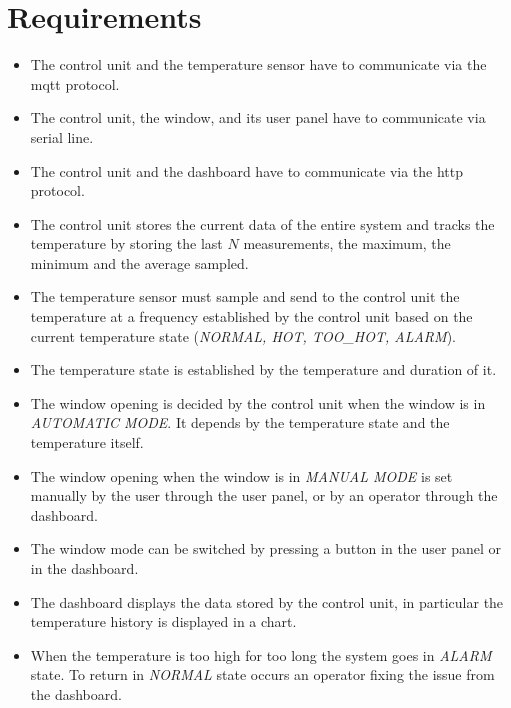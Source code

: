 \documentclass[a4paper,12pt]{report}
\begin{document}
    \section{Requirements}

        \begin{itemize}
            \item The control unit and the temperature sensor have to communicate via the mqtt protocol.
            \item The control unit, the window, and its user panel have to communicate via serial line.
            \item The control unit and the dashboard have to communicate via the http protocol.
            \item The control unit stores the current data of the entire system and tracks the temperature by storing the last $N$ measurements, the maximum, the minimum and the average sampled.
            \item The temperature sensor must sample and send to the control unit the temperature at a frequency established by the control unit based on the current temperature state (\textit{NORMAL, HOT, TOO\_HOT, ALARM}).
            \item The temperature state is established by the temperature and duration of it.
            \item The window opening is decided by the control unit when the window is in \textit{AUTOMATIC MODE}. It depends by the temperature state and the temperature itself.
            \item The window opening when the window is in \textit{MANUAL MODE} is set manually by the user through the user panel, or by an operator through the dashboard.
            \item The window mode can be switched by pressing a button in the user panel or in the dashboard.
            \item The dashboard displays the data stored by the control unit, in particular the temperature history is displayed in a chart.
            \item When the temperature is too high for too long the system goes in \textit{ALARM} state. To return in \textit{NORMAL} state occurs an operator fixing the issue from the dashboard.
        \end{itemize}
\end{document}
